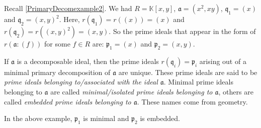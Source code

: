 \begin{example}
  Recall \autoref{PrimaryDecomexample2}. We had \( R = \mathbb{K}[x, y] \), \( \mathfrak{a} = (x^2, xy) \), \( \mathfrak{q}_1 = (x) \) and \( \mathfrak{q}_2 = (x, y)^2 \). Here, \( r(\mathfrak{q}_1) = r((x)) = (x) \) and  \( r(\mathfrak{q}_2) = r((x, y)^2) = (x,y) \). So the prime ideals that appear in the form of \( r(\mathfrak{a}: (f)) \) for some \( f \in R \) are:  \( \mathfrak{p}_1 = (x) \) and \( \mathfrak{p}_2 = (x, y) \).
\end{example}
\begin{definition}
  If \( \mathfrak{a} \) is a decomposable ideal, then the prime ideals \( r(\mathfrak{q}_i) = \mathfrak{p}_i\) arising out of a minimal primary decomposition of \( \mathfrak{a} \) are unique. These prime ideals are said to be \emph{prime ideals belonging to/associated with the ideal \( \mathfrak{a} \)}. Minimal prime ideals belonging to \( \mathfrak{a} \) are called \emph{minimal/isolated prime ideals belonging to \( \mathfrak{a} \)}, others are called  \emph{embedded prime ideals belonging to \( \mathfrak{a} \)}. These names come from geometry.
\end{definition}
In the above example, \( \mathfrak{p}_1 \) is minimal and \( \mathfrak{p}_2 \) is embedded.

